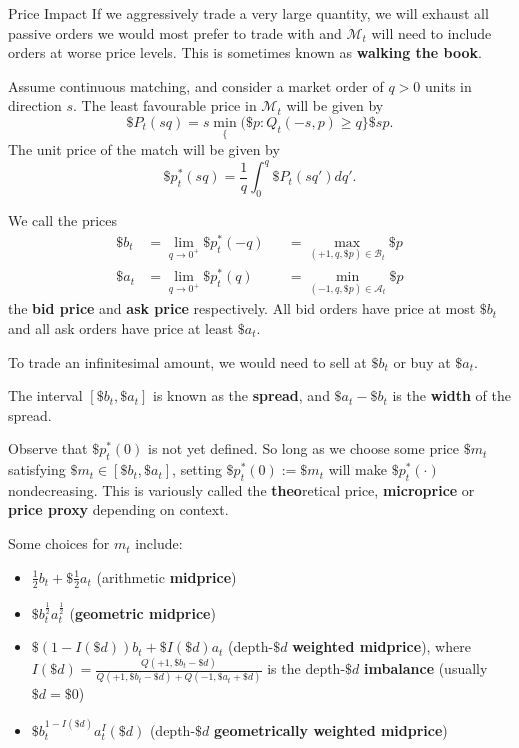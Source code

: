 \documentclass{beamer}
\begin{document}
\begin{frame}{Price Impact}
	If we aggressively trade a very large quantity, we will exhaust all passive orders we would most prefer to trade with and $\mathcal{M}_t$ will need to include orders at worse price levels. This is sometimes known as \textbf{walking the book}.

	Assume continuous matching, and consider a market order of $q>0$ units in direction $s$. The least favourable price in $\mathcal{M}_t$ will be given by
	$$\$P_t(sq) = s\min_\{(\$p : Q_t(-s,p)\geq q\} \$sp.$$
	The unit price of the match will be given by
	$$\$p^*_t(sq) = \frac{1}{q}\int_0^q \$P_t(sq')dq'.$$

	We call the prices
	\begin{align*}
		\$b_t	&= \lim_{q\to0^+} \$p^*_t(-q)	&&= \max_{(+1,q,\$p)\in\mathcal{B}_t} \$p
	\\	\$a_t	&= \lim_{q\to0^+} \$p^*_t(q)	&&= \min_{(-1,q,\$p)\in\mathcal{A}_t} \$p
	\end{align*}
	the \textbf{bid price} and \textbf{ask price} respectively. All bid orders have price at most $\$b_t$ and all ask orders have price at least $\$a_t$.

	To trade an infinitesimal amount, we would need to sell at $\$b_t$ or buy at $\$a_t$.

	The interval $[\$b_t,\$a_t]$ is known as the \textbf{spread}, and $\$a_t-\$b_t$ is the \textbf{width} of the spread.%

	\pause

	Observe that $\$p^*_t(0)$ is not yet defined. So long as we choose some price $\$m_t$ satisfying $\$m_t\in[\$b_t,\$a_t]$, setting $\$p^*_t(0) := \$m_t$ will make $\$p^*_t(\cdot)$ nondecreasing. This is variously called the \textbf{theo}retical price, \textbf{microprice} or \textbf{price proxy} depending on context.

	Some choices for $m_t$ include:
	\begin{itemize}
		\item $\frac{1}{2}b_t+\$\frac{1}{2}a_t$ (arithmetic \textbf{midprice})
		\item $\$b_t^\frac{1}{2}a_t^\frac{1}{2}$ (\textbf{geometric midprice})
		\item $\$(1-I(\$d))b_t + \$I(\$d)a_t$ (depth-$\$d$ \textbf{weighted midprice}), where $I(\$d)=\frac{Q(+1,\$b_t-\$d)}{Q(+1,\$b_t-\$d)+Q(-1,\$a_t+\$d)}$ is the depth-$\$d$ \textbf{imbalance} (usually $\$d=\$0$)
		\item $\$b_t^{1-I(\$d)}a_t^I(\$d)$ (depth-$\$d$ \textbf{geometrically weighted midprice})
	\end{itemize}


\end{frame}
\end{document}
